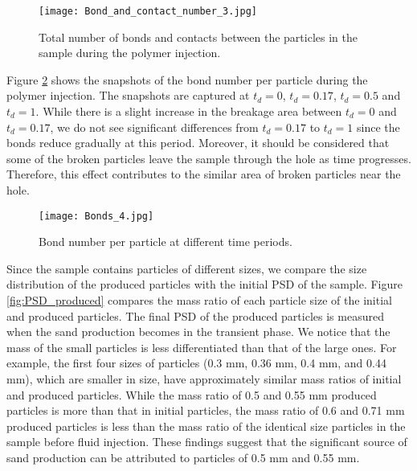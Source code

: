 \documentclass{article}
\begin{document}

\begin{figure}[H]
\begin{centering}
\texttt{[image: Bond\_and\_contact\_number\_3.jpg]}
\par\end{centering}
\caption{Total number of bonds and contacts between the particles in the sample during the polymer injection.\label{fig:Bond_and_contact}}
\end{figure}

Figure \ref{fig:Snap_bonds} shows the snapshots of the bond number per particle during the polymer injection. The snapshots are captured at $t_d = 0$, $t_d = 0.17$, $t_d = 0.5$ and $t_d = 1$. While there is a slight increase in the breakage area between  $t_d = 0$ and $t_d = 0.17$, we do not see significant differences from $t_d = 0.17$ to $t_d = 1$ since the bonds reduce gradually at this period. Moreover, it should be considered that some of the broken particles leave the sample through the hole as time progresses. Therefore, this effect contributes to the similar area of broken particles near the hole. 

\begin{figure}[H]
\begin{centering}
\texttt{[image: Bonds\_4.jpg]}
\par\end{centering}
\caption{Bond number per particle at different time periods.\label{fig:Snap_bonds}}
\end{figure}

Since the sample contains particles of different sizes, we compare the size distribution of the produced particles with the initial PSD of the sample. Figure \ref{fig:PSD_produced} compares the mass ratio of each particle size of the initial and produced particles. The final PSD of the produced particles is measured when the sand production becomes in the transient phase. We notice that the mass of the small particles is less differentiated than that of the large ones. For example, the first four sizes of particles (0.3 mm, 0.36 mm, 0.4 mm, and 0.44 mm), which are smaller in size, have approximately similar mass ratios of initial and produced particles. While the mass ratio of 0.5 and 0.55 mm produced particles is more than that in initial particles, the mass ratio of 0.6 and  0.71 mm produced particles is less than the mass ratio of the identical size particles in the sample before fluid injection. These findings suggest that the significant source of sand production can be attributed to particles of 0.5 mm and 0.55 mm.
\end{document}
